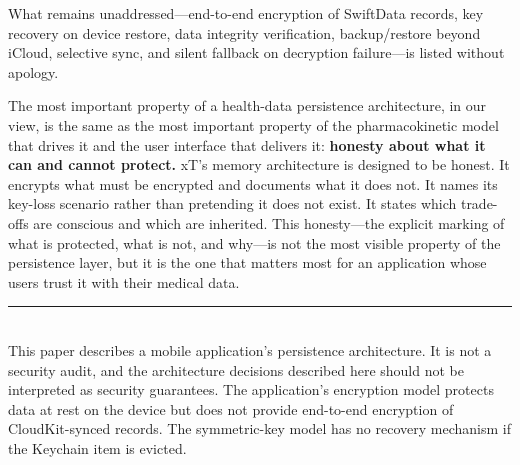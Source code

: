 \documentclass[11pt,a4paper]{article}
\begin{document}
What remains unaddressed---end-to-end encryption of SwiftData records, key
recovery on device restore, data integrity verification, backup/restore
beyond iCloud, selective sync, and silent fallback on decryption
failure---is listed without apology.

The most important property of a health-data persistence architecture, in
our view, is the same as the most important property of the pharmacokinetic
model that drives it and the user interface that delivers it: \textbf{honesty
about what it can and cannot protect.} xT's memory architecture is designed
to be honest. It encrypts what must be encrypted and documents what it does
not. It names its key-loss scenario rather than pretending it does not exist.
It states which trade-offs are conscious and which are inherited. This
honesty---the explicit marking of what is protected, what is not, and
why---is not the most visible property of the persistence layer, but it is
the one that matters most for an application whose users trust it with their
medical data.

\vfill
\noindent\rule{\linewidth}{0.4pt}\\[0.3em]
{\footnotesize This paper describes a mobile application's persistence
architecture. It is not a security audit, and the architecture decisions
described here should not be interpreted as security guarantees. The
application's encryption model protects data at rest on the device but does
not provide end-to-end encryption of CloudKit-synced records. The
symmetric-key model has no recovery mechanism if the Keychain item is
evicted.}
\end{document}
